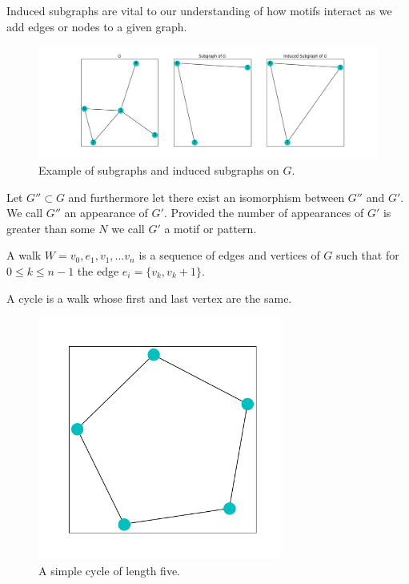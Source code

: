 \noindent Induced subgraphs are vital to our understanding of how motifs interact as we add edges or nodes
to a given graph.

\begin{figure}[h!]
    \includegraphics[width=15cm]{Images/subgraph.png}
    \centering
    \caption{Example of subgraphs and induced subgraphs on $G$.}
\end{figure}

\begin{dfn}
    Let $G'' \subset G$ and furthermore let there exist an isomorphism between $G''$ and $G'$. We call
    $G''$ an appearance of $G'$. Provided the number of appearances of $G'$ is greater than some $N$ we call $G'$
    a motif or pattern.
\end{dfn}

\begin{dfn}
    A walk $W = {v_0, e_1, v_1, \dots v_n}$ is a sequence of edges and vertices of $G$ such that
    for $0 \leq k \leq n-1$ the edge $e_i = \{v_k, v_k+1\}$.
\end{dfn}

\begin{dfn}
    A cycle is a walk whose first and last vertex are the same.
\end{dfn}

\begin{figure}[h!]
    \includegraphics[width=8cm]{Images/Cycle.png}
    \centering
    \caption{A simple cycle of length five.}
\end{figure}


